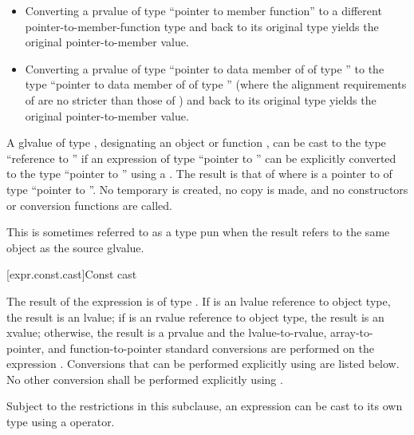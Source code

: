 \begin{itemize}
\item Converting a prvalue of type ``pointer to member function'' to a
different pointer-to-member-function type and back to its original type
yields the original pointer-to-member value.

\item Converting a prvalue of type ``pointer to data member of 
of type '' to the type ``pointer to data member of 
of type '' (where the alignment requirements of  are
no stricter than those of ) and back to its original type
yields the original pointer-to-member value.
\end{itemize}

\pnum
{}%
%
%
A glvalue of type ,
designating an object or function ,
can be cast to the type ``reference to ''
if an expression of type ``pointer to ''
can be explicitly converted to the type ``pointer to ''
using a .
The result is that of 
where  is a pointer to 
of type ``pointer to ''.
No temporary is created, no copy is made, and
no constructors or conversion
functions are called.
\begin{footnote}
This is sometimes referred to as a type pun
when the result refers to the same object as the source glvalue.
\end{footnote}

[expr.const.cast]{Const cast}

\pnum
{}%
%
The result of the expression  is of type
. If  is an lvalue reference to object type, the result is an
lvalue;
if  is an rvalue reference to object type, the result is an xvalue;
otherwise, the result is a prvalue and the
lvalue-to-rvalue, array-to-pointer,
and function-to-pointer standard conversions are
performed on the expression . Conversions that can be performed explicitly using
 are listed below. No other conversion shall be
performed explicitly using .

\pnum
\begin{note}
Subject to the restrictions in this subclause, an expression can be cast
to its own type using a  operator.
\end{note}

